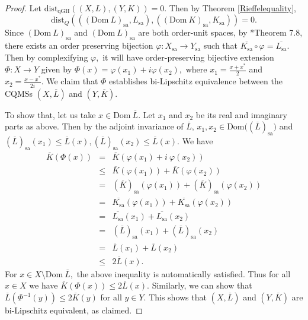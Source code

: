 \documentclass[a4paper,11pt,reqno]{amsart}
\theoremstyle{plain}
\theoremstyle{mainthmstyle}
\theoremstyle{named}
\numberwithin{equation}{section}
\newcommand{\Bea}{\begin{eqnarray*}}
\newcommand{\Eea}{\end{eqnarray*}}
\begin{document}
\begin{proof}
Let $\mathrm {dist}_{\mathrm {qGH}} ((X, L), (Y, K)) = 0.$ Then by Theorem \ref{Rieffelequality}, $$\mathrm {dist}_Q \left (\left (\left (\mathrm {Dom}\ L \right )_{\mathrm {sa}}, L_{\mathrm {sa}} \right ), \left (\left (\mathrm {Dom}\ K \right )_{\mathrm {sa}}, K_{\mathrm {sa}} \right ) \right ) = 0.$$
Since $\left (\mathrm {Dom}\ L \right )_{\mathrm {sa}}$ and $\left (\mathrm {Dom}\ L \right )_{\mathrm {sa}}$ are both order-unit spaces, by \cite{Rieffel-Gromov}*{Theorem 7.8}, there exists an order preserving bijection $\varphi : X_{\mathrm {sa}} \rightarrow Y_{\mathrm {sa}}$ such that $\overline {K_{\mathrm {sa}}} \circ \varphi = \overline {L_{\mathrm {sa}}}.$
Then by complexifying $\varphi,$ it will have order-preserving bijective extension $\Phi : X \rightarrow Y$ given by $\Phi (x) = \varphi \left (x_1 \right ) + i \varphi \left (x_2 \right ),$ where $x_1 = \frac {x + x^{\ast}} {2}$ and $x_2 = \frac {x - x^{\ast}} {2 i}.$ We claim that $\Phi$ establishes bi-Lipschitz equivalence between the CQMSs $(X, \overline {L})$ and $(Y, \overline {K})$. 

To show that, let us take $x \in \mathrm {Dom}\ \overline {L}.$ Let $x_1$ and $x_2$ be its real and imaginary parts as above. Then by the adjoint invariance of $\overline{L}$, $x_1,x_2\in \mathrm{Dom}\big((\overline{L})_{\mathrm{sa}}\big)$ and $(\overline{L})_{\mathrm{sa}}(x_1)\leq \overline{L}(x),(\overline{L})_{\mathrm{sa}}(x_2)\leq\overline{L}(x)$. We have
\Bea
\overline {K} \left (\Phi (x) \right ) & = & \overline K \left (\varphi \left (x_1 \right ) + i\ \varphi \left (x_2 \right ) \right ) \\ & \leq & \overline {K} \left (\varphi \left (x_1 \right ) \right ) + \overline {K} \left (\varphi \left (x_2 \right ) \right ) \\ & = & (\overline {K})_{\mathrm {sa}} \left (\varphi \left (x_1 \right ) \right ) + (\overline {K})_{\mathrm {sa}} \left (\varphi \left (x_2 \right ) \right ) \\ & = & \overline {K_{\mathrm {sa}}} \left (\varphi \left (x_1 \right ) \right ) + \overline {K_{\mathrm {sa}}} \left (\varphi \left (x_2 \right ) \right ) \\ & = & \overline {L_{\mathrm {sa}}} \left (x_1 \right ) + \overline {L_{\mathrm {sa}}} \left (x_2 \right ) \\ & = & (\overline {L})_{\mathrm {sa}} \left (x_1 \right ) + (\overline {L})_{\mathrm {sa}} \left (x_2 \right ) \\ & = & \overline {L} \left (x_1 \right ) + \overline {L} \left (x_2 \right ) \\ & \leq & 2 \overline {L} (x). 
\Eea
For $x \in X \setminus \mathrm {Dom}\ \overline {L},$ the above inequality is automatically satisfied. Thus for all $x \in X$ we have $\overline {K} \left (\Phi (x) \right )  \leq 2\overline {L} (x).$ Similarly, we can show that $\overline {L} \left (\Phi^{-1} (y) \right ) \leq 2 \overline {K} (y)$ for all $y \in Y.$ This shows that $(X, \overline{L})$ and $(Y, \overline{K})$ are bi-Lipschitz equivalent, as claimed.


\end{proof}
\end{document}
